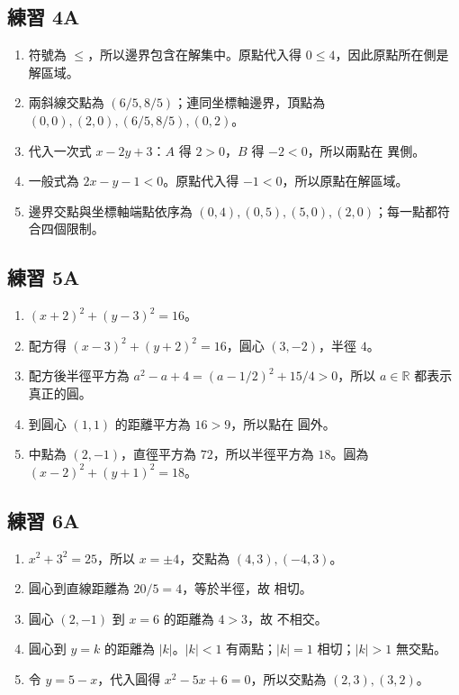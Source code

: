 \documentclass[11pt,a4paper]{article}
\providecommand{\tightlist}{%
  \setlength{\itemsep}{0pt}\setlength{\parskip}{0pt}}
\begin{document}
\subsection{練習 4A}\label{ux7df4ux7fd2-4a-1}

\begin{enumerate}
\def\labelenumi{\arabic{enumi}.}
\tightlist
\item
  符號為 \(\le\)，所以邊界包含在解集中。原點代入得 \(0\le4\)，因此原點所在側是解區域。
\item
  兩斜線交點為 \((6/5,8/5)\)；連同坐標軸邊界，頂點為 \(\boxed{(0,0),(2,0),(6/5,8/5),(0,2)}\)。
\item
  代入一次式 \(x-2y+3\)：\(A\) 得 \(2>0\)，\(B\) 得 \(-2<0\)，所以兩點在 \(\boxed{\text{異側}}\)。
\item
  一般式為 \(\boxed{2x-y-1<0}\)。原點代入得 \(-1<0\)，所以原點在解區域。
\item
  邊界交點與坐標軸端點依序為 \(\boxed{(0,4),(0,5),(5,0),(2,0)}\)；每一點都符合四個限制。
\end{enumerate}

\subsection{練習 5A}\label{ux7df4ux7fd2-5a-1}

\begin{enumerate}
\def\labelenumi{\arabic{enumi}.}
\tightlist
\item
  \(\boxed{(x+2)^2+(y-3)^2=16}\)。
\item
  配方得 \(\boxed{(x-3)^2+(y+2)^2=16}\)，圓心 \(\boxed{(3,-2)}\)，半徑 \(\boxed4\)。
\item
  配方後半徑平方為 \(a^2-a+4=(a-1/2)^2+15/4>0\)，所以 \(\boxed{a\in\mathbb R}\) 都表示真正的圓。
\item
  到圓心 \((1,1)\) 的距離平方為 \(16>9\)，所以點在 \(\boxed{\text{圓外}}\)。
\item
  中點為 \((2,-1)\)，直徑平方為 \(72\)，所以半徑平方為 \(18\)。圓為 \(\boxed{(x-2)^2+(y+1)^2=18}\)。
\end{enumerate}

\subsection{練習 6A}\label{ux7df4ux7fd2-6a-1}

\begin{enumerate}
\def\labelenumi{\arabic{enumi}.}
\tightlist
\item
  \(x^2+3^2=25\)，所以 \(x=\pm4\)，交點為 \(\boxed{(4,3),(-4,3)}\)。
\item
  圓心到直線距離為 \(20/5=4\)，等於半徑，故 \(\boxed{\text{相切}}\)。
\item
  圓心 \((2,-1)\) 到 \(x=6\) 的距離為 \(4>3\)，故 \(\boxed{\text{不相交}}\)。
\item
  圓心到 \(y=k\) 的距離為 \(|k|\)。\(|k|<1\) 有兩點；\(|k|=1\) 相切；\(|k|>1\) 無交點。
\item
  令 \(y=5-x\)，代入圓得 \(x^2-5x+6=0\)，所以交點為 \(\boxed{(2,3),(3,2)}\)。
\end{enumerate}
\end{document}
